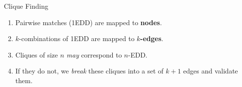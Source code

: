 \documentclass[10pt,compress]{beamer}
\begin{document}
\begin{frame}{Clique Finding}
    \begin{enumerate}
        \item Pairwise matches (1EDD) are mapped to \textbf{nodes}.
        \item $k$-combinations of 1EDD are mapped to \textbf{$k$-edges}.
        \item Cliques of size $n$ \emph{may} correspond to $n$-EDD.
        \item If they do not, we \emph{break} these cliques into a set of $k+1$ edges and
            validate them.
    \end{enumerate}

\end{frame}
\end{document}
